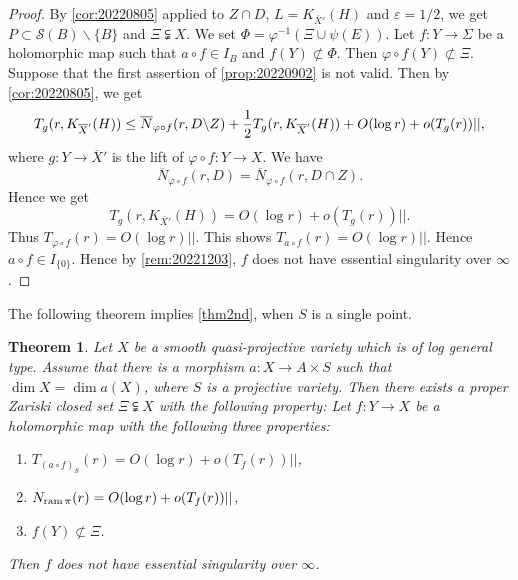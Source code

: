 \documentclass[11pt,english]{smfart}
\theoremstyle{plain}
\newtheorem{thm}{Theorem}[section]
\theoremstyle{definition}
\theoremstyle{remark}
\numberwithin{equation}{section}
\theoremstyle{plain}
\newcommand{\ram}{{\rm ram}\,}
\begin{document}
\begin{proof}
		By \cref{cor:20220805} applied to $Z\cap D$, $L=K_{\overline{X}'}(H)$ and $\varepsilon=1/2$, we get $P\subset \mathcal{S}(B)\backslash\{B\}$ and $\Xi\subsetneqq X$.
		We set $\Phi=\varphi^{-1}(\Xi\cup\psi(E))$.
		Let $f:Y\to \Sigma$ be a holomorphic map such that $a\circ f\in I_B$ and $f(Y)\not\subset \Phi$.
		Then $\varphi\circ f(Y)\not\subset \Xi$. 
		Suppose that the first assertion of \cref{prop:20220902} is not valid.
		Then by \cref{cor:20220805}, we get
		\begin{equation*}
			T_{g}(r,K_{\overline{X}'}(H))
			\leq \overline{N}_{\varphi\circ f}(r,D\backslash Z)+\frac{1}{2}T_{g}(r,K_{\overline{X}'}(H))
			\\
			+O(\log r)+o(T_{g}(r))||,
		\end{equation*}
		where $g:Y\to \overline{X}'$ is the lift of $\varphi\circ f:Y\to X$.
		We have
		$$
		\overline{N}_{\varphi\circ f}(r,D)=\overline{N}_{\varphi\circ f}(r,D\cap Z).$$
		Hence we get
		$$
		T_{g}(r,K_{\overline{X}'}(H))=O(\log r)+o(T_{g}(r))||.
		$$ 	 	
		Thus $T_{\varphi\circ f}(r)=O(\log r) ||$.
		This shows $T_{a\circ f}(r)=O(\log r) ||$. 
		Hence $a\circ f\in I_{\{0\}}$.
		Hence by \cref{rem:20221203}, $f$ does not have essential singularity over $\infty$.
	\end{proof}
	
	
	
	
	The following theorem implies \cref{thm2nd}, when $S$ is a single point.
	
	\begin{thm}\label{thm:20221201}
		Let $X$ be a smooth quasi-projective variety which is of log general type.
		Assume that there is a morphism $a:X\to A\times S$ such that $\dim X=\dim a(X)$, where $S$ is a projective variety.
		Then there exists a proper Zariski closed set $\Xi\subsetneqq X$ with the following property:
		Let $f:Y\to X$ be a holomorphic map with the following three properties:
		\begin{enumerate}[label=(\alph*)]
			\item \label{item1}
			$T_{(a\circ f)_S}(r)=O(\log r)+o(T_f(r))||$, 
			\item \label{item2}
			$N_{\ram\pi}(r)=O(\log r)+o(T_f(r))||$,
			\item \label{item3}
			$f(Y)\not\subset \Xi$.
		\end{enumerate}
		Then $f$ does not have essential singularity over $\infty$.
	\end{thm}
	
\end{document}
